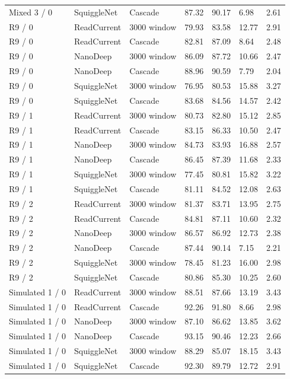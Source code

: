 \begin{longtable}{lllllll}
Mixed 3 / 0 & SquiggleNet & Cascade & 87.32 & 90.17 & 6.98 & 2.61\\
R9 / 0 & ReadCurrent & 3000 window & 79.93 & 83.58 & 12.77 & 2.91\\
R9 / 0 & ReadCurrent & Cascade & 82.81 & 87.09 & 8.64 & 2.48\\
R9 / 0 & NanoDeep & 3000 window & 86.09 & 87.72 & 10.66 & 2.47\\
R9 / 0 & NanoDeep & Cascade & 88.96 & 90.59 & 7.79 & 2.04\\
R9 / 0 & SquiggleNet & 3000 window & 76.95 & 80.53 & 15.88 & 3.27\\
R9 / 0 & SquiggleNet & Cascade & 83.68 & 84.56 & 14.57 & 2.42\\
R9 / 1 & ReadCurrent & 3000 window & 80.73 & 82.80 & 15.12 & 2.85\\
R9 / 1 & ReadCurrent & Cascade & 83.15 & 86.33 & 10.50 & 2.47\\
R9 / 1 & NanoDeep & 3000 window & 84.73 & 83.93 & 16.88 & 2.57\\
R9 / 1 & NanoDeep & Cascade & 86.45 & 87.39 & 11.68 & 2.33\\
R9 / 1 & SquiggleNet & 3000 window & 77.45 & 80.81 & 15.82 & 3.22\\
R9 / 1 & SquiggleNet & Cascade & 81.11 & 84.52 & 12.08 & 2.63\\
R9 / 2 & ReadCurrent & 3000 window & 81.37 & 83.71 & 13.95 & 2.75\\
R9 / 2 & ReadCurrent & Cascade & 84.81 & 87.11 & 10.60 & 2.32\\
R9 / 2 & NanoDeep & 3000 window & 86.57 & 86.92 & 12.73 & 2.38\\
R9 / 2 & NanoDeep & Cascade & 87.44 & 90.14 & 7.15 & 2.21\\
R9 / 2 & SquiggleNet & 3000 window & 78.45 & 81.23 & 16.00 & 2.98\\
R9 / 2 & SquiggleNet & Cascade & 80.86 & 85.30 & 10.25 & 2.60\\
Simulated 1 / 0 & ReadCurrent & 3000 window & 88.51 & 87.66 & 13.19 & 3.43\\
Simulated 1 / 0 & ReadCurrent & Cascade & 92.26 & 91.80 & 8.66 & 2.98\\
Simulated 1 / 0 & NanoDeep & 3000 window & 87.10 & 86.62 & 13.85 & 3.62\\
Simulated 1 / 0 & NanoDeep & Cascade & 93.15 & 90.46 & 12.23 & 2.66\\
Simulated 1 / 0 & SquiggleNet & 3000 window & 88.29 & 85.07 & 18.15 & 3.43\\
Simulated 1 / 0 & SquiggleNet & Cascade & 92.30 & 89.79 & 12.72 & 2.91\\

\end{longtable}
